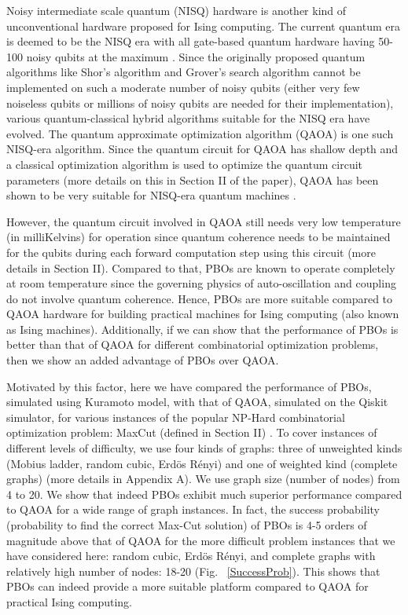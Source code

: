 \documentclass[%
 reprint,
 amsmath,amssymb,
 aps,
]{revtex4-2}
\begin{document}
Noisy intermediate scale quantum (NISQ) hardware is another kind of unconventional hardware proposed for Ising computing. The current quantum era is deemed to be the NISQ era with all gate-based quantum hardware having 50-100 noisy qubits at the maximum \citep{NISQReview}. Since the originally proposed quantum algorithms like Shor's algorithm and Grover's search algorithm cannot be implemented on such a moderate number of noisy qubits (either very few noiseless qubits or millions of noisy qubits are needed for their implementation), various quantum-classical hybrid algorithms suitable for the NISQ era have evolved. The quantum approximate optimization algorithm (QAOA) is one such NISQ-era algorithm. Since the quantum circuit for QAOA has shallow depth and a classical optimization algorithm is used to optimize the quantum circuit parameters (more details on this in Section II of the paper), QAOA has been shown to be very suitable for NISQ-era quantum machines \citep{NISQReview, QAOA_Farhi,QAOA_Tutorial}. 

However, the quantum circuit involved in QAOA still needs very low temperature (in milliKelvins) for operation since quantum coherence needs to be maintained for the qubits during each forward computation step using this circuit (more details in Section II). Compared to that, PBOs are known to operate completely at room temperature since the governing physics of auto-oscillation and coupling do not involve quantum coherence. Hence, PBOs are more suitable compared to QAOA hardware for building practical machines for Ising computing (also known as Ising machines). Additionally, if we can show that the performance of PBOs is better than that of QAOA for different combinatorial optimization problems, then we show an added advantage of PBOs over QAOA.  

Motivated by this factor, here we have compared the performance of PBOs, simulated using Kuramoto model, with that of QAOA, simulated on the Qiskit simulator, for various instances of the popular NP-Hard combinatorial optimization problem: MaxCut (defined in Section II) \citep{IsingComputingReview,Spin_Akerman3,MIT2}. To cover instances of different levels of difficulty, we use four kinds of graphs: three of unweighted kinds (Mobius ladder, random cubic, Erd{\"o}s R{\'e}nyi) and one of weighted kind (complete graphs) (more details in Appendix A). We use graph size (number of nodes) from 4 to 20. We show that indeed PBOs exhibit much superior performance compared to QAOA for a wide range of graph instances. In fact, the success probability (probability to find the correct Max-Cut solution) of PBOs is 4-5 orders of magnitude above that of QAOA for the more difficult problem instances that we have considered here: random cubic, Erd{\"o}s R{\'e}nyi, and complete graphs with relatively high number of nodes: 18-20 (Fig. ~\ref{SuccessProb}). This shows that PBOs can indeed provide a more suitable platform compared to QAOA for practical Ising computing.
\end{document}
